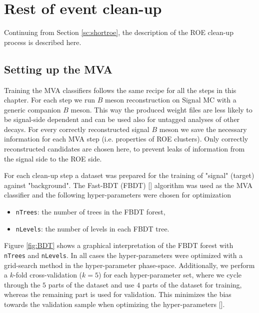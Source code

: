 \documentclass[oneside,a4paper,openany,12pt]{scrbook}
\begin{document}
\chapter{Rest of event clean-up}
\label{ch:roe}

Continuing from Section \ref{sc:shortroe}, the description of the ROE clean-up process is described here. 

\section{Setting up the MVA}

Training the MVA classifiers follows the same recipe for all the steps in this chapter. For each step we run $B$ meson reconstruction on Signal MC with a generic companion $B$ meson. This way the produced weight files are less likely to be signal-side dependent and can be used also for untagged analyses of other decays. For every correctly reconstructed signal $B$ meson we save the necessary information for each MVA step (i.e. properties of ROE clusters). Only correctly reconstructed candidates are chosen here, to prevent leaks of information from the signal side to the ROE side.

For each clean-up step a dataset was prepared for the training of "signal" (target) against "background". The Fast-BDT (FBDT) [] algorithm was used as the MVA classifier and the following hyper-parameters were chosen for optimization
\begin{itemize}
\item \texttt{nTrees}: the number of trees in the FBDT forest,
\item \texttt{nLevels}: the number of levels in each FBDT tree.
\end{itemize}

Figure \ref{fig:BDT} shows a graphical interpretation of the FBDT forest with \texttt{nTrees} and \texttt{nLevels}. In all cases the hyper-parameters were optimized with a grid-search method in the hyper-parameter phase-space. Additionally, we perform a $k$-fold cross-validation ($k=5$) for each hyper-parameter set, where we cycle through the $5$ parts of the dataset and use $4$ parts of the dataset for training, whereas the remaining part is used for validation. This minimizes the bias towards the validation sample when optimizing the hyper-parameters [].
\end{document}
